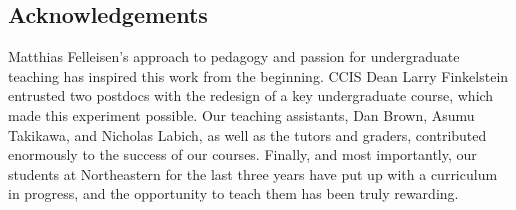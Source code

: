 \documentclass[submission,copyright]{eptcs}
\begin{document}
\cite{dvanhorn:sicp}

\cite{local:htdc}

\subsection*{Acknowledgements}

Matthias Felleisen's approach to pedagogy and passion for
undergraduate teaching has inspired this work from the beginning.
CCIS Dean Larry Finkelstein entrusted two postdocs with the redesign
of a key undergraduate course, which made this experiment possible.
Our teaching assistants, Dan Brown, Asumu Takikawa, and Nicholas
Labich, as well as the tutors and graders, contributed enormously to
the success of our courses. Finally, and most importantly, our
students at Northeastern for the last three years have put up with a
curriculum in progress, and the opportunity to teach them has been
truly rewarding.



\end{document}

